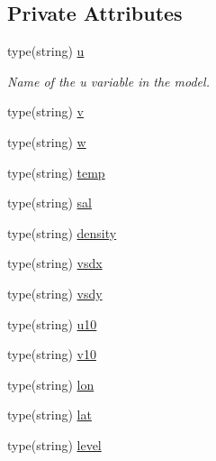 \subsection*{Private Attributes}
\begin{DoxyCompactItemize}
\item 
type(string) \mbox{\hyperlink{structsimulationglobals__mod_1_1var__names__t_a05e03dc8cb0d9e041cd0989d4bb283f6}{u}}
\begin{DoxyCompactList}\small\item\em Name of the \textquotesingle{}u\textquotesingle{} variable in the model. \end{DoxyCompactList}\item 
type(string) \mbox{\hyperlink{structsimulationglobals__mod_1_1var__names__t_a037c76a1788e918a911686b1a357b63c}{v}}
\item 
type(string) \mbox{\hyperlink{structsimulationglobals__mod_1_1var__names__t_ae4070fb0bad811c92b85bb008b3a269d}{w}}
\item 
type(string) \mbox{\hyperlink{structsimulationglobals__mod_1_1var__names__t_a2b8a91d6d50fa1312daa7b33447a1f23}{temp}}
\item 
type(string) \mbox{\hyperlink{structsimulationglobals__mod_1_1var__names__t_aa74b646a2e2aecbd80fc9e14db09c1fc}{sal}}
\item 
type(string) \mbox{\hyperlink{structsimulationglobals__mod_1_1var__names__t_a8ece0e46cb7873a7b7f2a5ded27a93c8}{density}}
\item 
type(string) \mbox{\hyperlink{structsimulationglobals__mod_1_1var__names__t_a5fdad135513660f172a952e6b4cb4cba}{vsdx}}
\item 
type(string) \mbox{\hyperlink{structsimulationglobals__mod_1_1var__names__t_a4f4344b96df0c845db47515a5848f9b2}{vsdy}}
\item 
type(string) \mbox{\hyperlink{structsimulationglobals__mod_1_1var__names__t_aea041c2634859e7f38fe692efeae1ad3}{u10}}
\item 
type(string) \mbox{\hyperlink{structsimulationglobals__mod_1_1var__names__t_a4dda010a72c58b6885c6b142a77d5d60}{v10}}
\item 
type(string) \mbox{\hyperlink{structsimulationglobals__mod_1_1var__names__t_ae81e1287e36878fcfed6360b14b05219}{lon}}
\item 
type(string) \mbox{\hyperlink{structsimulationglobals__mod_1_1var__names__t_aab90536922d15a1684cb7d0cfce99e95}{lat}}
\item 
type(string) \mbox{\hyperlink{structsimulationglobals__mod_1_1var__names__t_a1dc8ae36a22bfd43a9f1fd7e2d13548a}{level}}

\end{DoxyCompactItemize}
